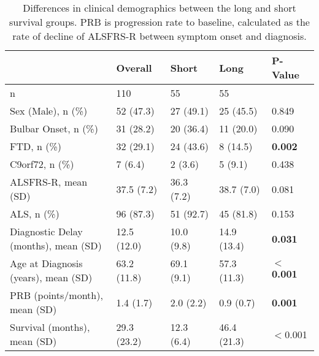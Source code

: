 \begin{table}
    \centering
    \caption{Differences in clinical demographics between the long and short survival groups. PRB is progression rate to baseline, calculated as the rate of decline of ALSFRS-R between symptom onset and diagnosis.}
    \label{tab:clinical_demographics}
    \begin{tabular}{|p{4cm}|llll|}
    \hline
                                                        & \textbf{Overall}     & \textbf{Short}        & \textbf{Long}         & \textbf{P-Value}   \\
    \hline
     n                                                  & 110         & 55         & 55          &           \\ \hline
     Sex (Male), n (\%)                                     & 52 (47.3)   & 27 (49.1)  & 25 (45.5)   & 0.849     \\ \hline
     Bulbar Onset, n (\%)                          & 31 (28.2)   & 20 (36.4)  & 11 (20.0)  & 0.090     \\\hline
     FTD, n (\%)                       & 32 (29.1)   & 24 (43.6)  & 8 (14.5)   & \textbf{0.002}     \\\hline
     C9orf72, n (\%)                               & 7 (6.4)     & 2 (3.6)    & 5 (9.1)   & 0.438     \\\hline
     ALSFRS-R, mean (SD)                                  & 37.5 (7.2)  & 36.3 (7.2) & 38.7 (7.0)  & 0.081     \\\hline
     ALS, n (\%)                                & 96 (87.3)   & 51 (92.7)  & 45 (81.8)   & 0.153     \\\hline
     \makecell[l]{Diagnostic Delay \\(months), mean (SD)}                 & 12.5 (12.0) & 10.0 (9.8) & 14.9 (13.4) & \textbf{0.031}     \\\hline
     \makecell[l]{Age at Diagnosis\\(years), mean (SD)}                   & 63.2 (11.8) & 69.1 (9.1) & 57.3 (11.3) & \textbf{\ensuremath{<}0.001 }   \\\hline
     \makecell[l]{PRB (points/month), \\mean (SD)}       & 1.4 (1.7)   & 2.0 (2.2)  & 0.9 (0.7)   & \textbf{0.001}     \\\hline
     \makecell[l]{Survival (months), \\mean (SD)}                          & 29.3 (23.2) & 12.3 (6.4) & 46.4 (21.3) & \ensuremath{<}0.001    \\\hline
    \end{tabular}
\end{table}

